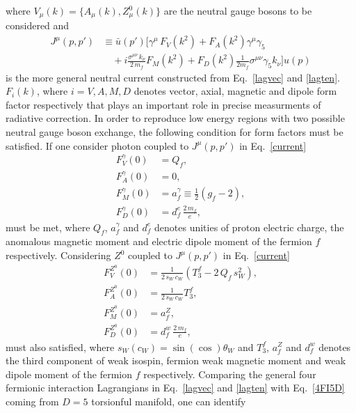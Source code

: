 where $V_\mu(k) = \{A_\mu(k),Z^0_\mu(k)\}$ are the neutral gauge bosons to be considered and
\begin{align}
  J^\mu(p,p') &\equiv \bar{u}(p')\Bigg[\gamma^\mu\,F_V(k^2) +F_A(k^2)\gamma^\mu\gamma_5  \label{current} \\
    \nonumber
    &\quad + i\frac{\sigma^{\mu\nu}\,k_\nu}{2\,m_f}F_M(k^2) + F_D(k^2)\frac{1}{2m_f}\sigma^{\mu\nu}\gamma_5 k_\nu\Bigg]u(p)
\end{align}
is the more general neutral current constructed from Eq.~\eqref{lagvec} and \eqref{lagten}. $F_i(k)$, where $i=V,A,M,D$ denotes vector, axial, magnetic and dipole form factor respectively that plays an important role in precise measurments of radiative correction. In order to reproduce low energy regions with two possible neutral gauge boson exchange, the following condition for form factors must be satisfied. If one consider photon coupled to $J^\mu(p,p')$ in Eq.~\eqref{current}
\begin{align}
F_V^\gamma(0) &= Q_f,  \\
F_A^\gamma(0) &= 0, \\
F_M^\gamma(0) &= a_f^\gamma \equiv \frac{1}{2}\left(g_f-2\right),\\
F_D^\gamma(0) &= d_f^e\,\frac{2\,m_f}{e},
\end{align}
must be met, where $Q_f$, $a_f^\gamma$ and $d_f^e$ denotes unities of proton electric charge, the anomalous magnetic moment and electric dipole moment of the fermion $f$ respectively. Considering $Z^0$ coupled to $J^\mu(p,p')$ in Eq.~\eqref{current}
\begin{align}
F_V^{Z^0}(0) &= \frac{1}{2\,s_W\,c_W}\left(T_3^f - 2\,Q_f\,s_W^2\right), \\
F_A^{Z^0}(0) &=  \frac{1}{2\,s_W\,c_W}T_3^f, \\
F_M^{Z^0}(0) &= a_f^Z, \\
F_D^{Z^0}(0) &= d_f^w\,\frac{2\,m_f}{e}, 
\end{align}
must also satisfied, where $s_W(c_W) = \sin(\cos)\theta_W$ and $T_3^f$, $a_f^Z$ and $d_f^w$ denotes the third component of weak isospin, fermion weak magnetic moment and weak dipole moment of the fermion $f$ respectively. Comparing the general four fermionic interaction Lagrangians in Eq.~\eqref{lagvec} and \eqref{lagten} with Eq.~\eqref{4FI5D} coming from $D = 5$ torsionful manifold, one can identify
